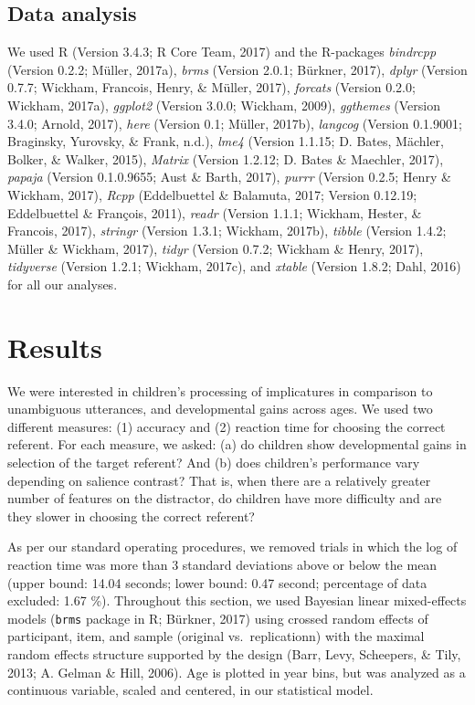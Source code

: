\documentclass[man]{apa6}
\theoremstyle{definition}
\theoremstyle{definition}
\theoremstyle{definition}
\theoremstyle{remark}
\begin{document}
\subsection{Data analysis}\label{data-analysis}

We used R (Version 3.4.3; R Core Team, 2017) and the R-packages
\emph{bindrcpp} (Version 0.2.2; Müller, 2017a), \emph{brms} (Version
2.0.1; Bürkner, 2017), \emph{dplyr} (Version 0.7.7; Wickham, Francois,
Henry, \& Müller, 2017), \emph{forcats} (Version 0.2.0; Wickham, 2017a),
\emph{ggplot2} (Version 3.0.0; Wickham, 2009), \emph{ggthemes} (Version
3.4.0; Arnold, 2017), \emph{here} (Version 0.1; Müller, 2017b),
\emph{langcog} (Version 0.1.9001; Braginsky, Yurovsky, \& Frank, n.d.),
\emph{lme4} (Version 1.1.15; D. Bates, Mächler, Bolker, \& Walker,
2015), \emph{Matrix} (Version 1.2.12; D. Bates \& Maechler, 2017),
\emph{papaja} (Version 0.1.0.9655; Aust \& Barth, 2017), \emph{purrr}
(Version 0.2.5; Henry \& Wickham, 2017), \emph{Rcpp} (Eddelbuettel \&
Balamuta, 2017; Version 0.12.19; Eddelbuettel \& François, 2011),
\emph{readr} (Version 1.1.1; Wickham, Hester, \& Francois, 2017),
\emph{stringr} (Version 1.3.1; Wickham, 2017b), \emph{tibble} (Version
1.4.2; Müller \& Wickham, 2017), \emph{tidyr} (Version 0.7.2; Wickham \&
Henry, 2017), \emph{tidyverse} (Version 1.2.1; Wickham, 2017c), and
\emph{xtable} (Version 1.8.2; Dahl, 2016) for all our analyses.

\section{Results}\label{results}

We were interested in children's processing of implicatures in
comparison to unambiguous utterances, and developmental gains across
ages. We used two different measures: (1) accuracy and (2) reaction time
for choosing the correct referent. For each measure, we asked: (a) do
children show developmental gains in selection of the target referent?
And (b) does children's performance vary depending on salience contrast?
That is, when there are a relatively greater number of features on the
distractor, do children have more difficulty and are they slower in
choosing the correct referent?

As per our standard operating procedures, we removed trials in which the
log of reaction time was more than 3 standard deviations above or below
the mean (upper bound: 14.04 seconds; lower bound: 0.47 second;
percentage of data excluded: 1.67 \%). Throughout this section, we used
Bayesian linear mixed-effects models (\texttt{brms} package in R;
Bürkner, 2017) using crossed random effects of participant, item, and
sample (original vs.~replicationn) with the maximal random effects
structure supported by the design (Barr, Levy, Scheepers, \& Tily, 2013;
A. Gelman \& Hill, 2006). Age is plotted in year bins, but was analyzed
as a continuous variable, scaled and centered, in our statistical model.
\end{document}
